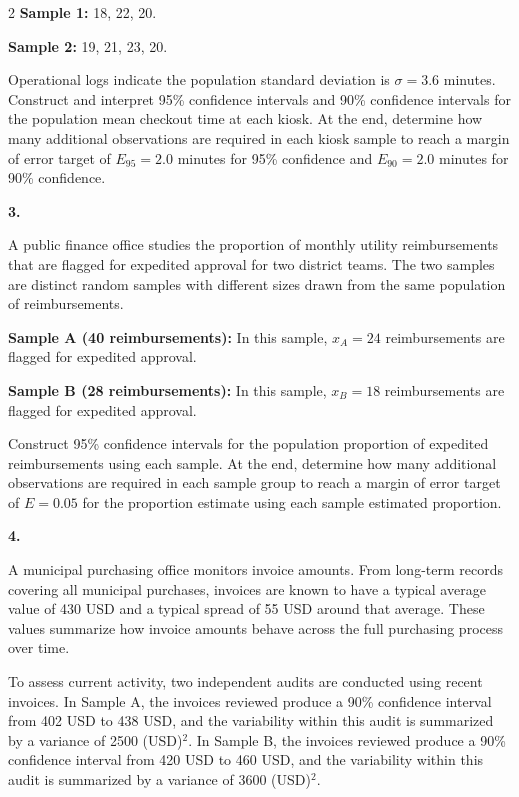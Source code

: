 \documentclass[12pt]{article}
\newcommand{\SubsectionBox}[1]{%
	\noindent\colorbox{gray!30}{%
		\parbox{\linewidth}{\textbf{#1}}%
	}\par\vspace{0.35cm}%
}
\begin{document}
\begin{multicols}{2}
		\textbf{Sample 1:} 18, 22, 20.

		\textbf{Sample 2:} 19, 21, 23, 20.

		Operational logs indicate the population standard deviation is $\sigma = 3.6$ minutes.
		Construct and interpret 95\% confidence intervals and 90\% confidence intervals for the population mean checkout time at each kiosk.
		At the end, determine how many additional observations are required in each kiosk sample to reach a margin of error target of $E_{95} = 2.0$ minutes for 95\% confidence and $E_{90} = 2.0$ minutes for 90\% confidence.

		\vspace{0.25cm}
		\SubsectionBox{3.}\vspace{-0.25cm}
		A public finance office studies the proportion of monthly utility reimbursements that are flagged for expedited approval for two district teams.
		The two samples are distinct random samples with different sizes drawn from the same population of reimbursements.

		\textbf{Sample A (40 reimbursements):}
		In this sample, $x_A = 24$ reimbursements are flagged for expedited approval.

		\textbf{Sample B (28 reimbursements):}
		In this sample, $x_B = 18$ reimbursements are flagged for expedited approval.

		Construct 95\% confidence intervals for the population proportion of expedited reimbursements using each sample.
		At the end, determine how many additional observations are required in each sample group to reach a margin of error target of $E = 0.05$ for the proportion estimate using each sample estimated proportion.

		\vspace{0.25cm}
		\SubsectionBox{4.}\vspace{-0.25cm}
		A municipal purchasing office monitors invoice amounts. From long-term records covering all municipal purchases, invoices are known to have a typical average value of 430 USD and a typical spread of 55 USD around that average. These values summarize how invoice amounts behave across the full purchasing process over time.

		To assess current activity, two independent audits are conducted using recent invoices. In Sample A, the invoices reviewed produce a 90\% confidence interval from 402 USD to 438 USD, and the variability within this audit is summarized by a variance of 2500 (USD)$^2$. In Sample B, the invoices reviewed produce a 90\% confidence interval from 420 USD to 460 USD, and the variability within this audit is summarized by a variance of 3600 (USD)$^2$.


\end{multicols}
\end{document}
